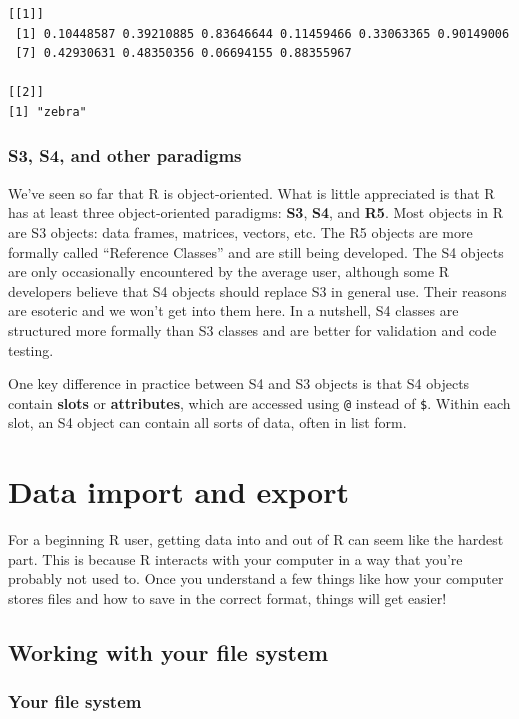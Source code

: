 \documentclass[
  13,
  letterpaper,
]{report}
\begin{document}
\begin{verbatim}
[[1]]
 [1] 0.10448587 0.39210885 0.83646644 0.11459466 0.33063365 0.90149006
 [7] 0.42930631 0.48350356 0.06694155 0.88355967

[[2]]
[1] "zebra"
\end{verbatim}

\subsection{S3, S4, and other paradigms}\label{sec-03-struct-other}

We've seen so far that R is object-oriented. What is little appreciated
is that R has at least three object-oriented paradigms: \textbf{S3},
\textbf{S4}, and \textbf{R5}. Most objects in R are S3 objects: data
frames, matrices, vectors, etc. The R5 objects are more formally called
``Reference Classes'' and are still being developed. The S4 objects are
only occasionally encountered by the average user, although some R
developers believe that S4 objects should replace S3 in general use.
Their reasons are esoteric and we won't get into them here. In a
nutshell, S4 classes are structured more formally than S3 classes and
are better for validation and code testing.

One key difference in practice between S4 and S3 objects is that S4
objects contain \textbf{slots} or \textbf{attributes}, which are
accessed using \texttt{@} instead of \texttt{\$}. Within each slot, an
S4 object can contain all sorts of data, often in list form.

\chapter{Data import and export}\label{sec-04}

For a beginning R user, getting data into and out of R can seem like the
hardest part. This is because R interacts with your computer in a way
that you're probably not used to. Once you understand a few things like
how your computer stores files and how to save in the correct format,
things will get easier!

\section{Working with your file system}\label{sec-04-files}

\subsection{Your file system}\label{sec-04-files-your}
\end{document}
